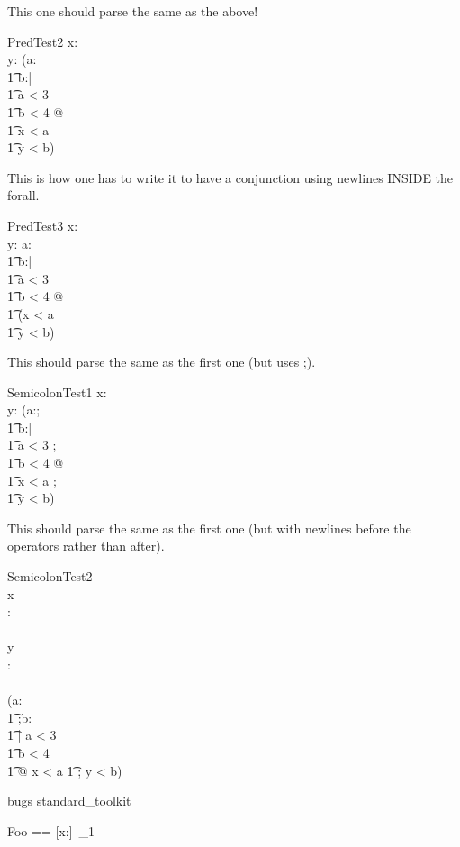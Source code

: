 \documentclass{article}
\begin{document}
This one should parse the same as the above!
\begin{schema}{PredTest2}
   x:\nat \\
   y:\nat
\where
   (\forall a:\nat \\
   \t1      b:\nat | \\
   \t1     a < 3 \\
   \t1     b < 4 @ \\
   \t1   x < a \\
   \t1   y < b)
\end{schema}

This is how one has to write it to have a conjunction using newlines
INSIDE the forall.
\begin{schema}{PredTest3}
   x:\nat \\
   y:\nat
\where
   \forall a:\nat \\
   \t1      b:\nat | \\
   \t1     a < 3 \\
   \t1     b < 4 @ \\
   \t1   (x < a \\
   \t1   y < b)
\end{schema}

This should parse the same as the first one (but uses ;).
\begin{schema}{SemicolonTest1}
   x:\nat \\
   y:\nat
\where
   (\forall a:\nat; \\
   \t1      b:\nat | \\
   \t1     a < 3 ; \\
   \t1     b < 4 @ \\
   \t1   x < a ; \\
   \t1   y < b)
\end{schema}

This should parse the same as the first one (but with newlines before
the operators rather than after).
\begin{schema}{SemicolonTest2} \\
   x \\ : \\ \nat \\
   y \\ : \\ \nat \\
\where
   (\forall a:\nat \\
   \t1      ;b:\nat \\
   \t1   | a < 3 \\
   \t1     b < 4 \\
   \t1   @ x < a
   \t1   ; y < b)
\end{schema}


\begin{zsection}
\SECTION bugs \parents standard\_toolkit
\end{zsection}

\begin{zed}
  Foo == [x:\nat]~_1
\end{zed}
\end{document}
